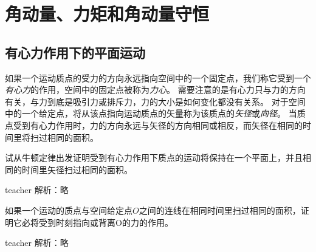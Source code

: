 
\chapter{角动量、力矩和角动量守恒}
\section{有心力作用下的平面运动}
如果一个运动质点的受力的方向永远指向空间中的一个固定点，我们称它受到一个\emph{有心力}的作用，空间中的固定点被称为\emph{力心}。
需要注意的是有心力只与力的方向有关，与力到底是吸引力或排斥力，力的大小是如何变化都没有关系。
对于空间中的一个给定点，将从该点指向运动质点的矢量称为该质点的\emph{矢径}或\emph{向径}。
当质点受到有心力作用时，力的方向永远与矢径的方向相同或相反，而矢径在相同的时间里将扫过相同的面积。
\begin{example}
	试从牛顿定律出发证明受到有心力作用下质点的运动将保持在一个平面上，并且相同的时间里矢径扫过相同的面积。
	\begin{taggedblock}{teacher}
		\newline
		解析：略
	\end{taggedblock}
\end{example}



\begin{example}
	如果一个运动的质点与空间给定点$O$之间的连线在相同时间里扫过相同的面积，证明它必将受到时刻指向或背离O的力的作用。
	\begin{taggedblock}{teacher}
		\newline
		解析：略
	\end{taggedblock}
\end{example}




